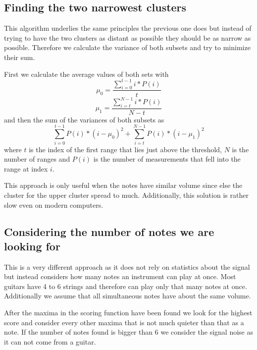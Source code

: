 \subsection{Finding the two narrowest clusters}
This algorithm underlies the same principles the previous one does but instead of trying to have the two clusters as distant as possible they should be as narrow as possible. Therefore we calculate the variance of both subsets and try to minimize their sum.

First we calculate the average values of both sets with 
$$ \mu_{0} = \frac{\sum_{i = 0}^{t - 1}i * P(i)}{t} $$
$$ \mu_{1} = \frac{\sum_{i = t}^{N - 1}i * P(i)}{N - t} $$
and then the sum of the variances of both subsets as
$$ \sum_{i = 0}^{t - 1}P(i) * (i - \mu_{0})^{2} + \sum_{i = t}^{N - 1}P(i) * (i - \mu_{1})^{2} $$
where $t$ is the index of the first range that lies just above the threshold, $N$ is the number of ranges and $P(i)$ is the number of measurements that fell into the range at index $i$.

This approach is only useful when the notes have similar volume since else the cluster for the upper cluster spread to much. Additionally, this solution is rather slow even on modern computers.

\subsection{Considering the number of notes we are looking for}
This is a very different approach as it does not rely on statistics about the signal but instead considers how many notes an instrument can play at once. Most guitars have 4 to 6 strings and therefore can play only that many notes at once. Additionally we assume that all simultaneous notes have about the same volume. 

After the maxima in the scoring function have been found we look for the highest score and consider every other maxima that is not much quieter than that as a note. If the number of notes found is bigger than 6 we consider the signal noise as it can not come from a guitar.
